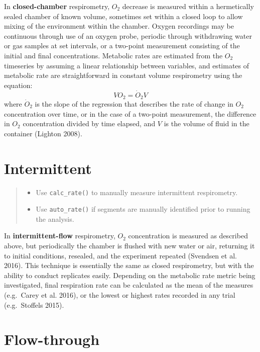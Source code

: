 \documentclass[]{book}
\providecommand{\tightlist}{%
  \setlength{\itemsep}{0pt}\setlength{\parskip}{0pt}}
\begin{document}
In \textbf{closed-chamber} respirometry, \(O_2\) decrease is measured
within a hermetically sealed chamber of known volume, sometimes set
within a closed loop to allow mixing of the environment within the
chamber. Oxygen recordings may be continuous through use of an oxygen
probe, periodic through withdrawing water or gas samples at set
intervals, or a two-point measurement consisting of the initial and
final concentrations. Metabolic rates are estimated from the \(O_2\)
timeseries by assuming a linear relationship between variables, and
estimates of metabolic rate are straightforward in constant volume
respirometry using the equation: \[VO_2 = \dot O_2V\] where \(\dot O_2\)
is the slope of the regression that describes the rate of change in
\(O_2\) concentration over time, or in the case of a two-point
measurement, the difference in \(O_2\) concentration divided by time
elapsed, and \(V\) is the volume of fluid in the container (Lighton
2008).

\section{Intermittent}\label{intermittent}

\begin{quote}
\begin{itemize}
\tightlist
\item
  Use \texttt{calc\_rate()} to manually measure intermittent
  respirometry.
\item
  Use \texttt{auto\_rate()} if segments are manually identified prior to
  running the analysis.
\end{itemize}
\end{quote}

In \textbf{intermittent-flow} respirometry, \(O_2\) concentration is
measured as described above, but periodically the chamber is flushed
with new water or air, returning it to initial conditions, resealed, and
the experiment repeated (Svendsen et al. 2016). This technique is
essentially the same as closed respirometry, but with the ability to
conduct replicates easily. Depending on the metabolic rate metric being
investigated, final respiration rate can be calculated as the mean of
the measures (e.g.~Carey et al. 2016), or the lowest or highest rates
recorded in any trial (e.g.~Stoffels 2015).

\section{Flow-through}\label{flow-through}
\end{document}
